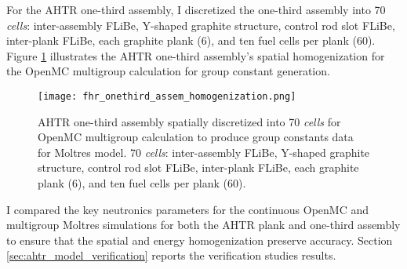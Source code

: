 For the \gls{AHTR} one-third assembly, I discretized the one-third assembly into 
70 \textit{cells}: inter-assembly \gls{FLiBe}, Y-shaped graphite structure, control 
rod slot \gls{FLiBe}, inter-plank \gls{FLiBe}, each graphite plank (6), and ten fuel 
cells per plank (60).
Figure \ref{fig:fhr_onethird_assem_homogenization} illustrates the \gls{AHTR} 
one-third assembly's spatial homogenization for the OpenMC multigroup calculation
for group constant generation. 
\begin{figure}[htbp]
    \centering
    \texttt{[image: fhr\_onethird\_assem\_homogenization.png]}
    \raggedright
    \caption{\acrfull{AHTR} one-third assembly spatially discretized into 
    70 \textit{cells} for OpenMC multigroup calculation to produce group constants 
    data for Moltres model.
    70 \textit{cells}: inter-assembly \gls{FLiBe}, Y-shaped graphite structure, control 
    rod slot \gls{FLiBe}, inter-plank \gls{FLiBe}, each graphite plank (6), and ten fuel 
    cells per plank (60).}
    \label{fig:fhr_onethird_assem_homogenization}
\end{figure}

I compared the key neutronics parameters for the continuous OpenMC and multigroup 
Moltres simulations for both the \gls{AHTR} plank and one-third assembly to ensure 
that the spatial and energy homogenization preserve accuracy.
Section \ref{sec:ahtr_model_verification} reports the verification studies results.

